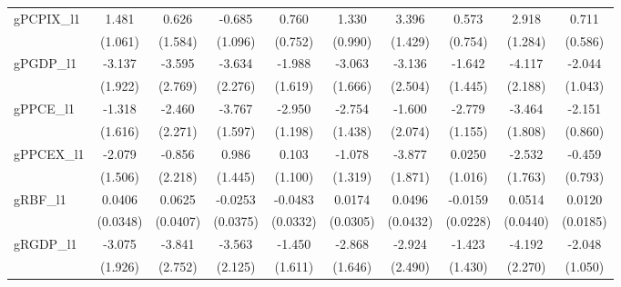 {\begin{tabular}{l*{9}{c}}
gPCPIX_l1       &    1.481         &    0.626         &   -0.685         &    0.760         &    1.330         &    3.396\sym{**} &    0.573         &    2.918\sym{**} &    0.711         \\
                &  (1.061)         &  (1.584)         &  (1.096)         &  (0.752)         &  (0.990)         &  (1.429)         &  (0.754)         &  (1.284)         &  (0.586)         \\
gPGDP_l1        &   -3.137         &   -3.595         &   -3.634         &   -1.988         &   -3.063\sym{*}  &   -3.136         &   -1.642         &   -4.117\sym{*}  &   -2.044\sym{*}  \\
                &  (1.922)         &  (2.769)         &  (2.276)         &  (1.619)         &  (1.666)         &  (2.504)         &  (1.445)         &  (2.188)         &  (1.043)         \\
gPPCE_l1        &   -1.318         &   -2.460         &   -3.767\sym{**} &   -2.950\sym{**} &   -2.754\sym{*}  &   -1.600         &   -2.779\sym{**} &   -3.464\sym{*}  &   -2.151\sym{**} \\
                &  (1.616)         &  (2.271)         &  (1.597)         &  (1.198)         &  (1.438)         &  (2.074)         &  (1.155)         &  (1.808)         &  (0.860)         \\
gPPCEX_l1       &   -2.079         &   -0.856         &    0.986         &    0.103         &   -1.078         &   -3.877\sym{**} &   0.0250         &   -2.532         &   -0.459         \\
                &  (1.506)         &  (2.218)         &  (1.445)         &  (1.100)         &  (1.319)         &  (1.871)         &  (1.016)         &  (1.763)         &  (0.793)         \\
gRBF_l1         &   0.0406         &   0.0625         &  -0.0253         &  -0.0483         &   0.0174         &   0.0496         &  -0.0159         &   0.0514         &   0.0120         \\
                & (0.0348)         & (0.0407)         & (0.0375)         & (0.0332)         & (0.0305)         & (0.0432)         & (0.0228)         & (0.0440)         & (0.0185)         \\
gRGDP_l1        &   -3.075         &   -3.841         &   -3.563\sym{*}  &   -1.450         &   -2.868\sym{*}  &   -2.924         &   -1.423         &   -4.192\sym{*}  &   -2.048\sym{*}  \\
                &  (1.926)         &  (2.752)         &  (2.125)         &  (1.611)         &  (1.646)         &  (2.490)         &  (1.430)         &  (2.270)         &  (1.050)         \\

\end{tabular}}
